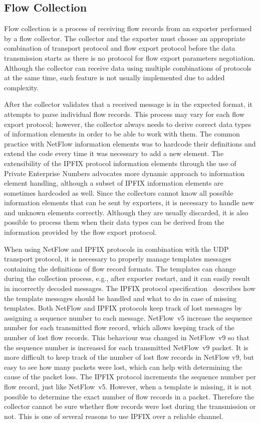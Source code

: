 \subsection{Flow Collection}\label{subsec:flow-collection}

Flow collection is a process of receiving flow records from an exporter performed by a flow collector. The collector and the exporter must choose an appropriate combination of transport protocol and flow export protocol before the data transmission starts as there is no protocol for flow export parameters negotiation. Although the collector can receive data using multiple combinations of protocols at the same time, such feature is not usually implemented due to added complexity.

After the collector validates that a received message is in the expected format, it attempts to parse individual flow records. This process may vary for each flow export protocol; however, the collector always needs to derive correct data types of information elements in order to be able to work with them. The common practice with NetFlow information elements was to hardcode their definitions and extend the code every time it was necessary to add a new element. The extensibility of the IPFIX protocol information elements through the use of Private Enterprise Numbers advocates more dynamic approach to information element handling, although a subset of IPFIX information elements are sometimes hardcoded as well. Since the collectors cannot know all possible information elements that can be sent by exporters, it is necessary to handle new and unknown elements correctly. Although they are usually discarded, it is also possible to process them when their data types can be derived from the information provided by the flow export protocol.

When using NetFlow and IPFIX protocols in combination with the UDP transport protocol, it is necessary to properly manage templates messages containing the definitions of flow record formats. The templates can change during the collection process, e.g., after exporter restart, and it can easily result in incorrectly decoded messages. The IPFIX protocol specification~\cite{rfc7011} describes how the template messages should be handled and what to do in case of missing templates. Both NetFlow and IPFIX protocols keep track of lost messages by assigning a sequence number to each message. NetFlow~v5 increase the sequence number for each transmitted flow record, which allows keeping track of the number of lost flow records. This behaviour was changed in NetFlow~v9 so that the sequence number is increased for each transmitted NetFlow~v9 packet. It is more difficult to keep track of the number of lost flow records in NetFlow v9, but easy to see how many packets were lost, which can help with determining the cause of the packet loss. The IPFIX protocol increments the sequence number per flow record, just like NetFlow~v5. However, when a template is missing, it is not possible to determine the exact number of flow records in a packet. Therefore the collector cannot be sure whether flow records were lost during the transmission or not. This is one of several reasons to use IPFIX over a reliable channel.

